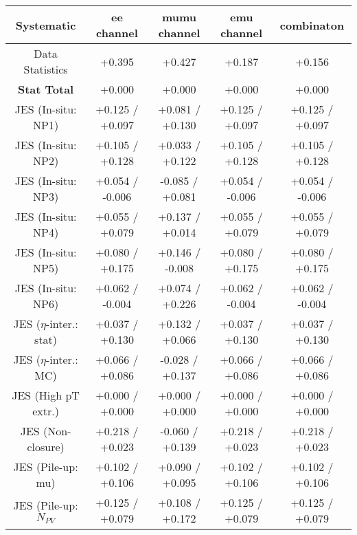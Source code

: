 \begin{table}[htbp]
\scriptsize
  \begin{center} 
  \begin{tabular}{|c|c|c|c|c|}
  \hline
Systematic                            &  ee channel&  mumu channel&  emu channel&  combinaton\\
  \hline
Data Statistics                       &+0.395              & +0.427              & +0.187              & +0.156             \\
\hline
\textbf{Stat Total}                   &+0.000              & +0.000              & +0.000              & +0.000             \\
\hline
JES (In-situ: NP1)                    &+0.125   / +0.097   & +0.081   / +0.130   & +0.125   / +0.097   & +0.125   / +0.097  \\
JES (In-situ: NP2)                    &+0.105   / +0.128   & +0.033   / +0.122   & +0.105   / +0.128   & +0.105   / +0.128  \\
JES (In-situ: NP3)                    &+0.054   / -0.006   & -0.085   / +0.081   & +0.054   / -0.006   & +0.054   / -0.006  \\
JES (In-situ: NP4)                    &+0.055   / +0.079   & +0.137   / +0.014   & +0.055   / +0.079   & +0.055   / +0.079  \\
JES (In-situ: NP5)                    &+0.080   / +0.175   & +0.146   / -0.008   & +0.080   / +0.175   & +0.080   / +0.175  \\
JES (In-situ: NP6)                    &+0.062   / -0.004   & +0.074   / +0.226   & +0.062   / -0.004   & +0.062   / -0.004  \\
JES ($\eta$-inter.: stat)               &+0.037   / +0.130   & +0.132   / +0.066   & +0.037   / +0.130   & +0.037   / +0.130  \\
JES ($\eta$-inter.: MC)                 &+0.066   / +0.086   & -0.028   / +0.137   & +0.066   / +0.086   & +0.066   / +0.086  \\
JES (High pT extr.)                  &+0.000   / +0.000   & +0.000   / +0.000   & +0.000   / +0.000   & +0.000   / +0.000  \\
JES (Non-closure)                     &+0.218   / +0.023   & -0.060   / +0.139   & +0.218   / +0.023   & +0.218   / +0.023  \\
JES (Pile-up: mu)                     &+0.102   / +0.106   & +0.090   / +0.095   & +0.102   / +0.106   & +0.102   / +0.106  \\
JES (Pile-up: $N_{PV}$                  &+0.125   / +0.079   & +0.108   / +0.172   & +0.125   / +0.079   & +0.125   / +0.079  \\

\end{tabular}
\end{center}
\end{table}
